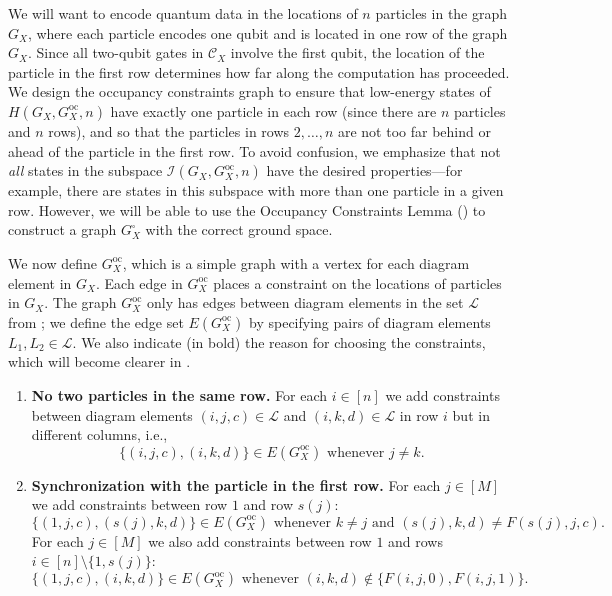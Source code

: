 \documentclass[../thesis-main/thesis-main]{subfiles}
\begin{document}
We will want to encode quantum data in the locations of $n$ particles in the graph $G_X$, where each particle encodes one qubit and is located in one row of the graph $G_X$. Since all two-qubit gates in $\mathcal{C}_{X}$ involve the first qubit, the location of the particle in the first row determines how far along the computation has proceeded. We design the occupancy constraints graph to ensure that low-energy states of $H(G_X,G_X^{\text{oc}},n)$ have exactly one particle in each row (since there are $n$ particles and $n$ rows), and so that the particles in rows $2,\ldots,n$ are not too far behind or ahead of the particle in the first row. To avoid confusion, we emphasize that not \emph{all} states in the subspace $\mathcal{I}(G_X,G_X^{\text{oc}},n)$ have the desired properties---for example, there are states in this subspace with more than one particle in a given row. However, we will be able to use the Occupancy Constraints Lemma () to construct a graph $G_X^{\square}$ with the correct ground space.

We now define $G_X^{\text{oc}}$, which is a simple graph with a vertex for each diagram element in $G_X$. Each edge in $G_X^{\text{oc}}$ places a constraint on the locations of particles in $G_X$. The graph $G_X^{\text{oc}}$ only has edges between diagram elements in the set $\mathcal{L}$ from ; we define the edge set $E(G_X^{\text{oc}})$ by specifying pairs of diagram elements $L_{1},L_{2}\in\mathcal{L}$. We also indicate (in bold) the reason for choosing the constraints, which will become clearer in .
\begin{enumerate}
\item \textbf{No two particles in the same row.} For each $i\in[n]$ we add constraints between diagram elements $(i,j,c)\in\mathcal{L}$ and $(i,k,d)\in\mathcal{L}$ in row $i$ but in different columns, i.e.,
\begin{equation}
\{\left(i,j,c\right),\left(i,k,d\right)\}\in E(G_X^{\text{oc}})\text{ whenever }j\neq k.\label{eq:occ_constraints_type1}
\end{equation}
\item \textbf{Synchronization with the particle in the first row.} For each $j\in[M]$ we add constraints between row $1$ and row $s(j)$:
\begin{equation}
\{(1,j,c),(s(j),k,d)\}\in E(G_X^{\text{oc}})\text{ whenever }k\neq j\text{ and }(s(j),k,d)\neq F(s(j),j,c).
\end{equation}
For each $j\in[M]$ we also add constraints between row $1$ and rows $i\in[n]\setminus\{1,s(j)\}$:
\begin{equation}
\{(1,j,c),(i,k,d)\}\in E(G_X^{\text{oc}})\text{ whenever }(i,k,d)\notin\{F(i,j,0),F(i,j,1)\}.
\end{equation}
\end{enumerate}
\end{document}
